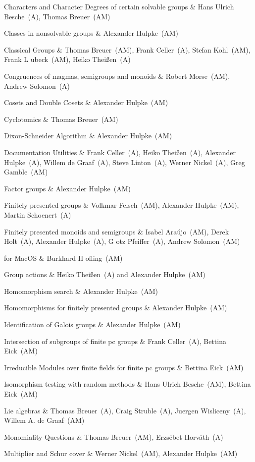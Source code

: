 Characters and Character Degrees of certain solvable groups &
Hans Ulrich Besche~(A), Thomas Breuer~(AM)

Classes in nonsolvable groups &
Alexander Hulpke~(AM)

Classical Groups &
Thomas Breuer~(AM), Frank Celler~(A), Stefan Kohl~(AM), 
Frank L{ u}beck~(AM), Heiko Thei{\ss}en~(A)

Congruences of magmas, semigroups and monoids &
Robert Morse~(AM), Andrew Solomon~(A)

Cosets and Double Cosets &
Alexander Hulpke~(AM)

Cyclotomics &
Thomas Breuer~(AM)

Dixon-Schneider Algorithm &
Alexander Hulpke~(AM)

Documentation Utilities &
Frank Celler~(A), Heiko Thei{\ss}en~(A), Alexander Hulpke~(A), 
Willem de Graaf~(A), Steve Linton~(A), Werner Nickel~(A), Greg Gamble~(AM)

Factor groups &
Alexander Hulpke~(AM)

Finitely presented groups &
Volkmar Felsch~(AM), Alexander Hulpke~(AM), Martin Schoenert~(A)

Finitely presented monoids and semigroups &
Isabel Ara{\'u}jo~(AM), Derek Holt~(A), Alexander Hulpke~(A), G{ o}tz Pfeiffer~(A), Andrew Solomon~(AM)

{\GAP} for MacOS & 
Burkhard H{ o}fling~(AM)

Group actions &
Heiko Thei{\ss}en~(A) and Alexander Hulpke~(AM)

Homomorphism search &
Alexander Hulpke~(AM)

Homomorphisms for finitely presented groups &
Alexander Hulpke~(AM)

Identification of Galois groups &
Alexander Hulpke~(AM)

Intersection of subgroups of finite pc groups &
Frank Celler~(A), Bettina Eick~(AM)

Irreducible Modules over finite fields for finite pc groups &
Bettina Eick~(AM)

Isomorphism testing with random methods &
Hans Ulrich Besche~(AM), Bettina Eick~(AM)

Lie algebras &
Thomas Breuer~(A), Craig Struble~(A), Juergen Wisliceny~(A), Willem A. de Graaf~(AM)

Monomiality Questions &
Thomas Breuer~(AM), Erzs{\'e}bet Horv{\'a}th~(A)

Multiplier and Schur cover &
Werner Nickel~(AM), Alexander Hulpke~(AM)

